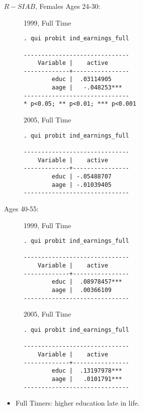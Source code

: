 \documentclass{beamer}
\begin{document}
\begin{frame}[fragile]{$R-SIAB$, Females }
Ages 24-30:
\begin{figure}
\centering
\begin{minipage}[b]{0.3\textwidth}{1999, Full Time}
\begin{Verbatim}[fontsize=\tiny]
. qui probit ind_earnings_full 

------------------------------
    Variable |    active      
-------------+----------------
        educ |  .03114905     
        aage |   -.048253*** 
------------------------------
* p<0.05; ** p<0.01; *** p<0.001
\end{Verbatim}
\end{minipage}
\begin{minipage}[b]{0.3\textwidth}{2005, Full Time}
\begin{Verbatim}[fontsize=\tiny]
. qui probit ind_earnings_full

------------------------------
    Variable |    active      
-------------+----------------
        educ | -.05488707     
        aage | -.01039405   
------------------------------
\end{Verbatim}
\end{minipage}
\end{figure}
Ages 40-55:
\begin{figure}
\begin{minipage}[b]{0.3\textwidth}{1999, Full Time}
\begin{Verbatim}[fontsize=\tiny]
. qui probit ind_earnings_full 

------------------------------
    Variable |    active      
-------------+----------------
        educ |  .08978457***  
        aage |  .00366109  
------------------------------
\end{Verbatim}
\end{minipage}
\begin{minipage}[b]{0.3\textwidth}{2005, Full Time}
\begin{Verbatim}[fontsize=\tiny]
. qui probit ind_earnings_full

------------------------------
    Variable |    active      
-------------+----------------
        educ |  .13197978***  
        aage |   .0101791***    
------------------------------
\end{Verbatim}
\end{minipage}
\end{figure}
\begin{itemize}
\item Full Timers: higher education late in life.
\end{itemize}
\end{frame}
\end{document}
